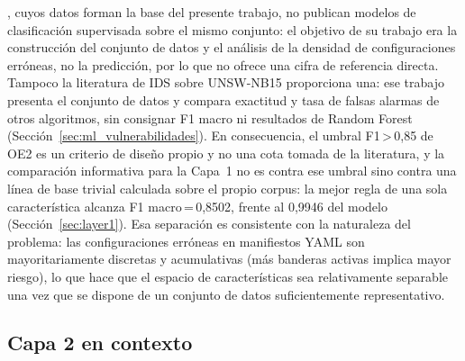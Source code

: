 \citet{Rahman2022}, cuyos datos forman la base del presente
trabajo, no publican modelos de clasificación supervisada sobre el mismo
conjunto: el objetivo de su trabajo era la construcción del conjunto de datos y el
análisis de la densidad de configuraciones erróneas, no la predicción, por lo que no
ofrece una cifra de referencia directa. Tampoco la literatura de \acs{IDS} sobre
UNSW-NB15 \citep{Moustafa2015} proporciona una: ese trabajo presenta el conjunto
de datos y compara exactitud y tasa de falsas alarmas de otros algoritmos, sin
consignar F1 macro ni resultados de Random Forest
(Sección~\ref{sec:ml_vulnerabilidades}). En consecuencia, el umbral
F1\,>\,0,85 de OE2 es un criterio de diseño propio y no una cota tomada de la
literatura, y la comparación informativa para la Capa~1 no es contra ese umbral
sino contra una línea de base trivial calculada sobre el propio corpus: la mejor
regla de una sola característica alcanza F1 macro\,=\,0,8502, frente al 0,9946
del modelo (Sección~\ref{sec:layer1}). Esa separación es consistente
con la naturaleza del problema: las configuraciones erróneas en manifiestos
\acs{YAML} son mayoritariamente discretas y acumulativas (más banderas activas
implica mayor riesgo), lo que hace que el espacio de características sea
relativamente separable una vez que se dispone de un conjunto de datos
suficientemente representativo.

\subsection{Capa 2 en contexto}


